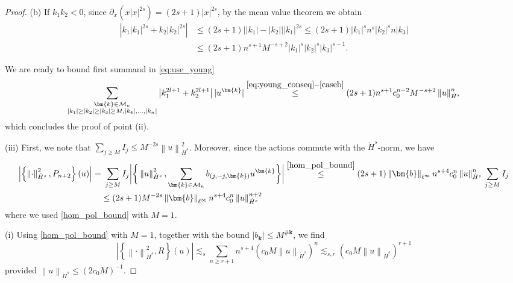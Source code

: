 \documentclass[a4paper,10pt,reqno]{article}
\theoremstyle{definition}
\theoremstyle{plain}
\theoremstyle{plain}
\theoremstyle{definition}
\theoremstyle{plain}
\theoremstyle{plain}
\theoremstyle{plain}
\theoremstyle{definition}
\theoremstyle{definition}
\newcommand{\norm}[1]{\left\lVert #1 \right\rVert}
\def \M{\mathcal{M}}
\def \k{\bm{k}}
\begin{document}
\begin{proof}
\medskip 

\noindent (b) If $k_1k_2 < 0$, since $\partial_x (x|x|^{2s}) = (2s+1)|x|^{2s}$, by the mean value theorem we obtain
\begin{equation}\label{caseb}
\begin{split}
\left \lvert k_1|k_1|^{2s} + k_2|k_2|^{2s} \right \rvert &\le (2s+1) \left \lvert | k_1 | - | k_2 | \right \rvert |k_1|^{2s} \le (2s+1) |k_1|^s n^s |k_2|^s n |k_3| \\
&\le (2s+1) n^{s+1} M^{-s+2} |k_1|^s |k_2|^s |k_3|^{s-1}.
\end{split}
\end{equation}

\medskip

We are ready to bound first summand in \eqref{eq:use_young}
\[
\sum_{ \substack{ \k \in \M_n \\ |k_1| \ge |k_2| \ge |k_3| \ge M,|k_4|,\ldots,|k_n| } } \left \lvert k_1^{2l+1}+k_2^{2l+1} \right \rvert \lvert u^{\k} \rvert \stackrel{\eqref{eq:young_conseq}-\eqref{caseb}}{\le} (2s+1) n^{s+1} c_0^{n-2} M^{-s+2} \norm{u}_{\dot{H}^s}^n
\]
which concludes the proof of point (ii).

\medskip

\noindent (iii) First, we note that $\sum_{j \ge M} I_j \le M^{-2s} \norm{u}_{\dot{H}^s}^2$.
Moreover, since the actions commute with the $\dot{H}^s$-norm, we have
\[
\begin{split}
\left \lvert \left \{ \norm{\cdot}_{\dot{H}^s}^2 , P_{n+2} \right \} (u) \right \rvert =&\ \sum_{j \ge M} I_j \bigg \lvert \bigg \{ \norm{u}_{\dot{H}^s}^2 ,\sum_{\k \in \M_n} b_{(j,-j,\k)}  u^{\k} \bigg \} \bigg \rvert 
\stackrel{\eqref{hom_pol_bound}}{\le} (2s+1) \norm{\bm{b}}_{\ell^{\infty}} n^{s+4} c_0^n \norm{u}_{\dot{H}^s}^{n}\, \sum_{j\geq M} I_j\\
& \le (2s+1) M^{-2s} \norm{\bm{b}}_{\ell^{\infty}} n^{s+4} c_0^n \norm{u}_{\dot{H}^s}^{n+2}
\end{split}
\]
where we used \eqref{hom_pol_bound} with $M=1$.

\medskip 

\noindent (i) Using \eqref{hom_pol_bound} with $M=1$, together with the bound $|b_{\k}| \le M^{\#\k}$, we find
\[
\left \lvert \left \{ \norm{\cdot}_{\dot{H}^s}^2 , R \right \} (u) \right \rvert \lesssim_s \sum_{n \ge r+1} n^{s+4} \left ( c_0 M \norm{u}_{\dot{H}^s} \right )^n\lesssim_{s,r} \left ( c_0 M \norm{u}_{\dot{H}^s} \right )^{r+1}
\]
provided $\norm{u}_{\dot{H}^s} \le \left ( 2 c_0 M \right )^{-1}$.
\end{proof}
\end{document}
